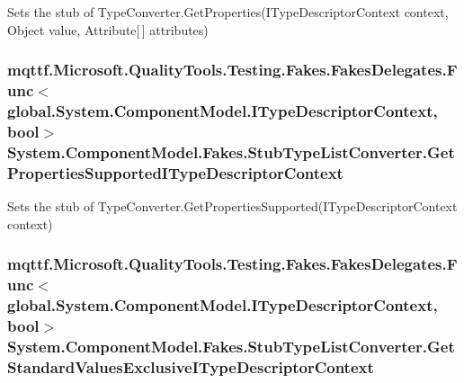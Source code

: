 Sets the stub of Type\-Converter.\-Get\-Properties(\-I\-Type\-Descriptor\-Context context, Object value, Attribute\mbox{[}$\,$\mbox{]} attributes)

\hypertarget{class_system_1_1_component_model_1_1_fakes_1_1_stub_type_list_converter_a0a5d2a4d19dbe63022799edcd6135d42}{
\subsubsection[{Get\-Properties\-Supported\-I\-Type\-Descriptor\-Context}]{\setlength{\rightskip}{0pt plus 5cm}mqttf.\-Microsoft.\-Quality\-Tools.\-Testing.\-Fakes.\-Fakes\-Delegates.\-Func$<$global.\-System.\-Component\-Model.\-I\-Type\-Descriptor\-Context, bool$>$ System.\-Component\-Model.\-Fakes.\-Stub\-Type\-List\-Converter.\-Get\-Properties\-Supported\-I\-Type\-Descriptor\-Context}}\label{class_system_1_1_component_model_1_1_fakes_1_1_stub_type_list_converter_a0a5d2a4d19dbe63022799edcd6135d42}


Sets the stub of Type\-Converter.\-Get\-Properties\-Supported(\-I\-Type\-Descriptor\-Context context)

\hypertarget{class_system_1_1_component_model_1_1_fakes_1_1_stub_type_list_converter_ad2b9a7aeeca221068318faa7058983b1}{
\subsubsection[{Get\-Standard\-Values\-Exclusive\-I\-Type\-Descriptor\-Context}]{\setlength{\rightskip}{0pt plus 5cm}mqttf.\-Microsoft.\-Quality\-Tools.\-Testing.\-Fakes.\-Fakes\-Delegates.\-Func$<$global.\-System.\-Component\-Model.\-I\-Type\-Descriptor\-Context, bool$>$ System.\-Component\-Model.\-Fakes.\-Stub\-Type\-List\-Converter.\-Get\-Standard\-Values\-Exclusive\-I\-Type\-Descriptor\-Context}}\label{class_system_1_1_component_model_1_1_fakes_1_1_stub_type_list_converter_ad2b9a7aeeca221068318faa7058983b1}


